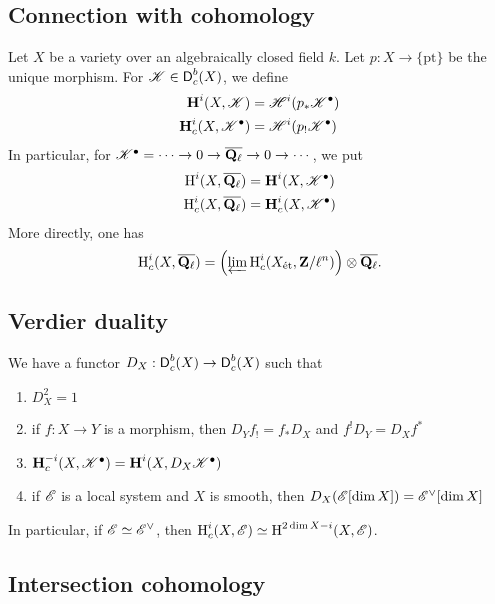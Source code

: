 \documentclass{article}
\begin{document}
\subsection{Connection with cohomology}

Let $X$ be a variety over an algebraically closed field $k$. Let 
$p:X\to \{\mathrm{pt}\}$ be the unique morphism. For $\mathscr{K}\in \operatorname{\mathsf{D}}_c^b(X)$, 
we define 
\begin{align*}
  \operatorname{\mathbf{H}}^i(X,\mathscr{K}) &= \mathscr{H}^i(p_\ast \mathscr{K}^\bullet) \\
  \operatorname{\mathbf{H}}_c^i(X,\mathscr{K}^\bullet) &= \mathscr{H}^i(p_! \mathscr{K}^\bullet) 
\end{align*}
In particular, for $\mathscr{K}^\bullet = \cdots \to 0 \to \overline{\mathbf{Q}_\ell} \to 0 \to \cdots$, 
we put 
\begin{align*}
  \operatorname{H}^i(X,\overline{\mathbf{Q}_\ell}) &= \operatorname{\mathbf{H}}^i(X,\mathscr{K}^\bullet) \\
  \operatorname{H}_c^i(X,\overline{\mathbf{Q}_\ell}) &= \operatorname{\mathbf{H}}_c^i(X,\mathscr{K}^\bullet) 
\end{align*}
More directly, one has 
\[
  \operatorname{H}_c^i(X,\overline{\mathbf{Q}_\ell}) = \left(\varprojlim \operatorname{H}_c^i(X_{\textnormal{\'et}},\mathbf{Z}/\ell^n)\right)\otimes \overline{\mathbf{Q}_\ell} .
\]


\subsection{Verdier duality}

We have a functor $D_X:\operatorname{\mathsf{D}}_c^b(X) \to \operatorname{\mathsf{D}}_c^b(X)$ such that 
\begin{enumerate}
  \item $D_X^2=1$
  \item if $f:X\to Y$ is a morphism, then $D_Y f_! = f_\ast D_X$ and $f^! D_Y = D_X f^\ast$ 
  \item $\operatorname{\mathbf{H}}_c^{-i}(X,\mathscr{K}^\bullet) = \operatorname{\mathbf{H}}^i(X,D_X \mathscr{K}^\bullet)$
  \item if $\mathscr{E}$ is a local system and $X$ is smooth, then 
    $D_X(\mathscr{E}[\dim X]) = \mathscr{E}^\vee[\dim X]$
\end{enumerate}
In particular, if $\mathscr{E}\simeq \mathscr{E}^\vee$, then 
$\operatorname{H}_c^i(X,\mathscr{E}) \simeq \operatorname{H}^{2\dim X-i}(X,\mathscr{E})$. 


\subsection{Intersection cohomology}
\end{document}
